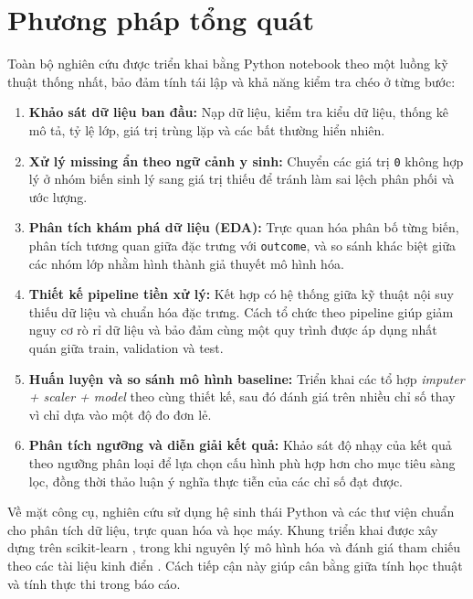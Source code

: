 \section{Phương pháp tổng quát}
Toàn bộ nghiên cứu được triển khai bằng Python notebook theo một luồng kỹ thuật thống nhất, bảo đảm tính tái lập và khả năng
kiểm tra chéo ở từng bước:
\begin{enumerate}[leftmargin=1.8em]
    \item \textbf{Khảo sát dữ liệu ban đầu:} Nạp dữ liệu, kiểm tra kiểu dữ liệu, thống kê mô tả, tỷ lệ lớp, giá trị trùng lặp
    và các bất thường hiển nhiên.

    \item \textbf{Xử lý missing ẩn theo ngữ cảnh y sinh:} Chuyển các giá trị \texttt{0} không hợp lý ở nhóm biến sinh lý sang
    giá trị thiếu để tránh làm sai lệch phân phối và ước lượng.

    \item \textbf{Phân tích khám phá dữ liệu (EDA):} Trực quan hóa phân bố từng biến, phân tích tương quan giữa đặc trưng với
    \texttt{outcome}, và so sánh khác biệt giữa các nhóm lớp nhằm hình thành giả thuyết mô hình hóa.

    \item \textbf{Thiết kế pipeline tiền xử lý:} Kết hợp có hệ thống giữa kỹ thuật nội suy thiếu dữ liệu và chuẩn hóa đặc trưng.
    Cách tổ chức theo pipeline giúp giảm nguy cơ rò rỉ dữ liệu và bảo đảm cùng một quy trình được áp dụng nhất quán giữa train,
    validation và test.

    \item \textbf{Huấn luyện và so sánh mô hình baseline:} Triển khai các tổ hợp \textit{imputer + scaler + model} theo cùng thiết kế,
    sau đó đánh giá trên nhiều chỉ số thay vì chỉ dựa vào một độ đo đơn lẻ.

    \item \textbf{Phân tích ngưỡng và diễn giải kết quả:} Khảo sát độ nhạy của kết quả theo ngưỡng phân loại để lựa chọn cấu hình
    phù hợp hơn cho mục tiêu sàng lọc, đồng thời thảo luận ý nghĩa thực tiễn của các chỉ số đạt được.
\end{enumerate}

Về mặt công cụ, nghiên cứu sử dụng hệ sinh thái Python và các thư viện chuẩn cho phân tích dữ liệu, trực quan hóa và học máy.
Khung triển khai được xây dựng trên scikit-learn \cite{pedregosa2011sklearn}, trong khi nguyên lý mô hình hóa và đánh giá tham chiếu
theo các tài liệu kinh điển \cite{hastie2009elements}. Cách tiếp cận này giúp cân bằng giữa tính học thuật và tính thực thi trong báo cáo.

